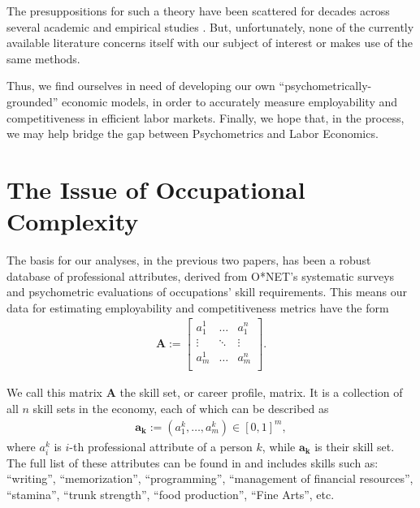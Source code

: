 \documentclass[hidelinks, nonatbib]{elsarticle}
\begin{document}
The presuppositions for such a theory have been scattered for decades across several academic and empirical studies \parencite[e.g.][]{winter_behavioral_labor_econ, berg_behavioral_labor_econ, onet1998data, gippity2024}. But, unfortunately, none of the currently available literature \parencite[see][]{onet_publications} concerns itself with our subject of interest or makes use of the same methods.

Thus, we find ourselves in need of developing our own ``psychometrically-grounded'' economic models, in order to accurately measure employability and competitiveness in efficient labor markets. Finally, we hope that, in the process, we may help bridge the gap between Psychometrics and Labor Economics.

\newpage
\section{The Issue of Occupational Complexity}
\label{issue_of_occupational_complexity}
The basis for our analyses, in the previous two papers, has been a robust database of professional attributes, derived from O*NET's systematic surveys and psychometric evaluations of occupations' skill requirements. This means our data for estimating employability and competitiveness metrics have the form
\begin{gather}
    \textbf{A}
    :=
    \begin{bmatrix}
        a_{1}^{1} & \hdots & a_{1}^{n} \\
        \vdots    & \ddots & \vdots    \\
        a_{m}^{1} & \hdots & a_{m}^{n} \\
    \end{bmatrix}
    .
\end{gather}

We call this matrix \textbf{A} the skill set, or career profile, matrix. It is a collection of all $n$ skill sets in the economy, each of which can be described as
\begin{gather}
    \boldsymbol{a_k}
    :=
    (a_{1}^{k}, \dots, a_{m}^{k})
    \in
    [0,1] ^ m
    ,
\end{gather}
where $a_{i}^{k}$ is $i$-th professional attribute of a person $k$, while $\boldsymbol{a_k}$ is their skill set. The full list of these attributes can be found in \textcite{onet2023data} and includes skills such as: ``writing'', ``memorization'', ``programming'', ``management of financial resources'', ``stamina'', ``trunk strength'', ``food production'', ``Fine Arts'', etc.
\end{document}
